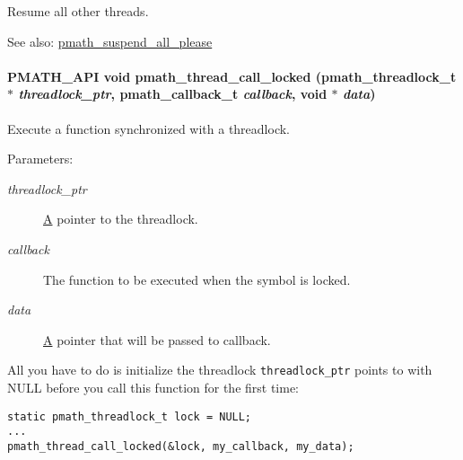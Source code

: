 Resume all other threads. 

\begin{Desc}
\item[See also:]\hyperlink{group__threads_g688141bacfb504b83dc319695f243b95}{pmath\_\-suspend\_\-all\_\-please} \end{Desc}
\hypertarget{group__threads_gfcbd1d376791cb95a78e102366b7b79a}{
\paragraph[{pmath\_\-thread\_\-call\_\-locked}]{\setlength{\rightskip}{0pt plus 5cm}PMATH\_\-API void pmath\_\-thread\_\-call\_\-locked ({\bf pmath\_\-threadlock\_\-t} $\ast$ {\em threadlock\_\-ptr}, \/  {\bf pmath\_\-callback\_\-t} {\em callback}, \/  void $\ast$ {\em data})}\hfill}
\label{group__threads_gfcbd1d376791cb95a78e102366b7b79a}


Execute a function synchronized with a threadlock. 

\begin{Desc}
\item[Parameters:]
\begin{description}
\item[{\em threadlock\_\-ptr}]\hyperlink{class_a}{A} pointer to the threadlock. \item[{\em callback}]The function to be executed when the symbol is locked. \item[{\em data}]\hyperlink{class_a}{A} pointer that will be passed to callback.\end{description}
\end{Desc}
All you have to do is initialize the threadlock {\tt threadlock\_\-ptr} points to with NULL before you call this function for the first time: 

\begin{Code}\begin{verbatim}static pmath_threadlock_t lock = NULL;
...
pmath_thread_call_locked(&lock, my_callback, my_data);
\end{verbatim}
\end{Code}



